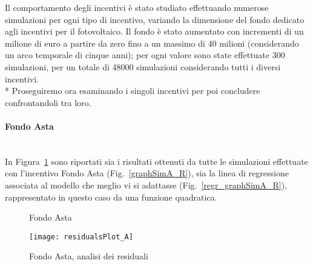 \documentclass[12pt,a4paper,openright,twoside]{report}
\newcommand{\myparagraph}[1]{\paragraph{#1}\mbox{}\\}
\begin{document}
Il comportamento degli incentivi è stato studiato effettuando numerose simulazioni per ogni tipo di incentivo, variando la dimensione del fondo dedicato agli incentivi per il fotovoltaico. Il fondo è stato aumentato con incrementi di un milione di euro a partire da zero  fino a un massimo di 40 milioni (considerando un arco temporale di cinque anni); per ogni valore sono state effettuate 300 simulazioni, per un totale di 48000 simulazioni considerando tutti i diversi incentivi.\\*
Proseguiremo ora esaminando i singoli incentivi per poi concludere confrontandoli tra loro.

\myparagraph{Fondo Asta}

In Figura~\ref{graphSimA} sono riportati sia i risultati ottenuti da tutte le simulazioni effettuate con l'incentivo Fondo Asta (Fig.~\ref{graphSimA_R}), sia la linea di regressione associata al modello che meglio vi si adattasse (Fig.~\ref{regr_graphSimA_R}), rappresentato in questo caso da una funzione quadratica.

\begin{figure}[H]
	\centering
	\qquad
	\caption{Fondo Asta}
	\label{graphSimA}
\end{figure}

\begin{figure}[hbt]
	\centering
	\texttt{[image: residualsPlot\_A]}
	\caption{Fondo Asta, analisi dei residuali}
	\label{residualsPlot_A}
\end{figure}
\end{document}
